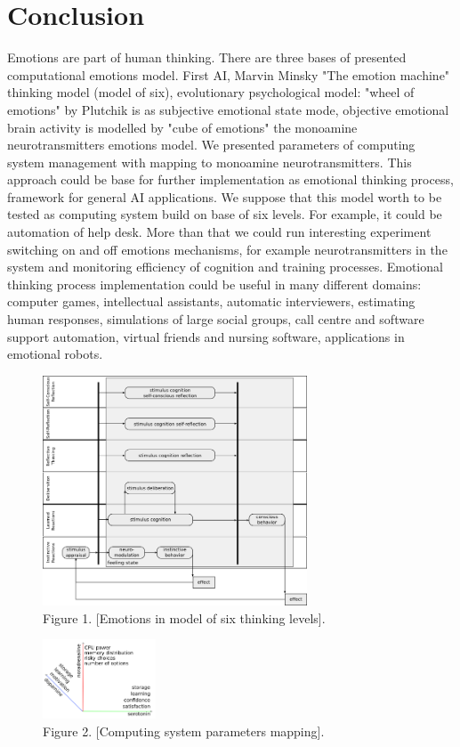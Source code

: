 \section{Conclusion}

Emotions are part of human thinking. There are three bases of presented computational emotions model. First AI, Marvin Minsky "The emotion machine"\cite{emotionmachine} thinking model (model of six), evolutionary psychological model: "wheel of emotions" by Plutchik\cite{natureofemotions} is as subjective emotional state mode, objective emotional brain activity is modelled by "cube of emotions" the monoamine neurotransmitters emotions model. We presented parameters of computing system management with mapping to monoamine neurotransmitters. This approach could be base for further implementation as emotional thinking process, framework for general AI applications. We suppose that this model worth to be tested as computing system build on base of six levels. For example, it could be automation of help desk. More than that we could run interesting experiment switching on and off emotions mechanisms, for example neurotransmitters in the system and monitoring efficiency of cognition and training processes. Emotional thinking process implementation could be useful in many different domains: computer games, intellectual assistants, automatic interviewers, estimating human responses, simulations of large social groups, call centre and software support automation, virtual friends and nursing software, applications in emotional robots.

\begin{figure}[h!]
 \centering
 \includegraphics[width=0.7\textwidth]{six_levels_of_emotions}
 \caption{Figure 1. [Emotions in model of six thinking levels].}
\end{figure}

\begin{figure}[h!]
 \centering
 \includegraphics[width=0.3\textwidth]{parameters_mapping180}
 \caption{Figure 2. [Computing system parameters mapping].}
\end{figure}
